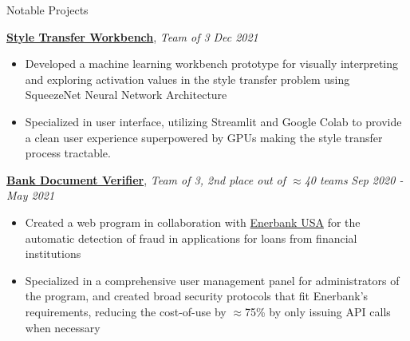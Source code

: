 \documentclass{resume}
\begin{document}
%
%
\begin{rSection}{Notable Projects}

    \href{https://github.com/jlucasa/style-transfer-vis}{{\bf Style Transfer Workbench}}, {\em Team of 3} {\em \hfill Dec 2021}
    \vspace{-6pt}
    \begin{itemize}[nosep]
        \item Developed a machine learning workbench prototype for visually interpreting and exploring activation values in the style transfer problem using SqueezeNet Neural Network Architecture
        \item Specialized in user interface, utilizing Streamlit and Google Colab to provide a clean user experience superpowered by GPUs making the style transfer process tractable.
    \end{itemize}

    
    {\bf \href{https://bdv-2021.web.app}{Bank Document Verifier}}, {\em Team of 3, 2nd place out of $\approx$40 teams} {\em \hfill Sep 2020 - May 2021}
    \vspace{-6pt}
    \begin{itemize}[nosep]
        \item Created a web program in collaboration with \href{https://enerbank.com/}{Enerbank USA} for the automatic detection of fraud in applications for loans from financial institutions
        \item Specialized in a comprehensive user management panel for administrators of the program, and created broad security protocols that fit Enerbank's requirements, reducing the cost-of-use by $\approx$75\% by only issuing API calls when necessary
    \end{itemize}
    

\end{rSection}
\end{document}

